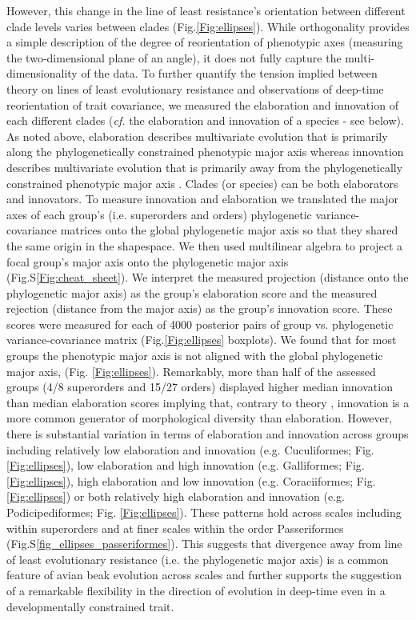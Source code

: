 \documentclass[12pt,letterpaper]{article}
\begin{document}
\bigskip

However, this change in the line of least resistance's orientation between different clade levels varies between clades (Fig.\ref{Fig:ellipses}).
While orthogonality provides a simple description of the degree of reorientation of phenotypic axes (measuring the two-dimensional plane of an angle), it does not fully capture the multi-dimensionality of the data.
To further quantify the tension implied between theory on lines of least evolutionary resistance and observations of deep-time reorientation of trait covariance, we measured the elaboration and innovation of each different clades (\textit{cf.} the elaboration and innovation of a species - see below).
As noted above, elaboration describes multivariate evolution that is primarily along the phylogenetically constrained phenotypic major axis whereas innovation describes multivariate evolution that is primarily away from the phylogenetically constrained phenotypic major axis \cite{endler2005animal}.
Clades (or species) can be both elaborators and innovators.
To measure innovation and elaboration we translated the major axes of each group's (i.e. superorders and orders) phylogenetic variance-covariance matrices onto the global phylogenetic major axis so that they shared the same origin in the shapespace.
We then used multilinear algebra to project a focal group's major axis onto the phylogenetic major axis (Fig.S\ref{Fig:cheat_sheet}).
We interpret the measured projection (distance onto the phylogenetic major axis) as the group's elaboration score and the measured rejection (distance from the major axis) as the group's innovation score.
These scores were measured for each of 4000 posterior pairs of group vs. phylogenetic variance-covariance matrix (Fig.\ref{Fig:ellipses} boxplots).
We found that for most groups the phenotypic major axis is not aligned with the global phylogenetic major axis, (Fig. \ref{Fig:ellipses}).
Remarkably, more than half of the assessed groups (4/8 superorders and 15/27 orders) displayed higher median innovation than median elaboration scores implying that, contrary to theory \cite{schluter1996adaptive,marroig2005size}, innovation is a more common generator of morphological diversity than elaboration.
However, there is substantial variation in terms of elaboration and innovation across groups including relatively low elaboration and innovation (e.g. Cuculiformes; Fig. \ref{Fig:ellipses}), low elaboration and high innovation (e.g. Galliformes; Fig. \ref{Fig:ellipses}), high elaboration and low innovation (e.g. Coraciiformes; Fig. \ref{Fig:ellipses}) or both relatively high elaboration and innovation (e.g. Podicipediformes; Fig. \ref{Fig:ellipses}).
These patterns hold across scales including within superorders and at finer scales within the order Passeriformes (Fig.S\ref{fig_ellipses_passeriformes}).
This suggests that divergence away from line of least evolutionary resistance (i.e. the phylogenetic major axis) is a common feature of avian beak evolution across scales and further supports the suggestion of a remarkable flexibility in the direction of evolution in deep-time even in a developmentally constrained trait.
\end{document}
